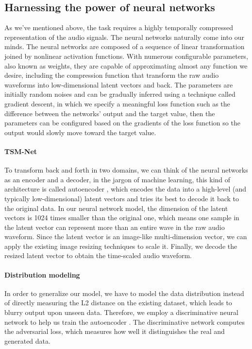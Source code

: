 \documentclass[12pt]{article}
\begin{document}
\subsection{Harnessing the power of neural networks}
As we've mentioned above, the task requires a highly temporally compressed representation of the audio signals. The neural networks naturally come into our minds. The neural networks are composed of a sequence of linear transformation joined by nonlinear activation functions. With numerous configurable parameters, also known as weights, they are capable of approximating almost any function we desire, including the compression function that transform the raw audio waveforms into low-dimensional latent vectors and back. The parameters are initially random noises and can be gradually inferred using a technique called gradient descent, in which we specify a meaningful loss function such as the difference between the networks' output and the target value, then the parameters can be configured based on the gradients of the loss function so the output would slowly move toward the target value.

\paragraph{TSM-Net}
To transform back and forth in two domains, we can think of the neural networks as an encoder and a decoder, in the jargon of machine learning, this kind of architecture is called autoencoder \cite{kra91}, which encodes the data into a high-level (and typically low-dimensional) latent vectors and tries its best to decode it back to the original data. In our neural network model, the dimension of the latent vectors is 1024 times smaller than the original one, which means one sample in the latent vector can represent more than an entire wave in the raw audio waveform. Since the latent vector is an image-like multi-dimension vector, we can apply the existing image resizing techniques to scale it. Finally, we decode the resized latent vector to obtain the time-scaled audio waveform.

\paragraph{Distribution modeling}
In order to generalize our model, we have to model the data distribution instead of directly measuring the L2 distance on the existing dataset, which leads to blurry output upon unseen data. Therefore, we employ a discriminative neural network to help us train the autoencoder \cite{goo14}. The discriminative network computes the adversarial loss, which measures how well it distinguishes the real and generated data.


\end{document}
